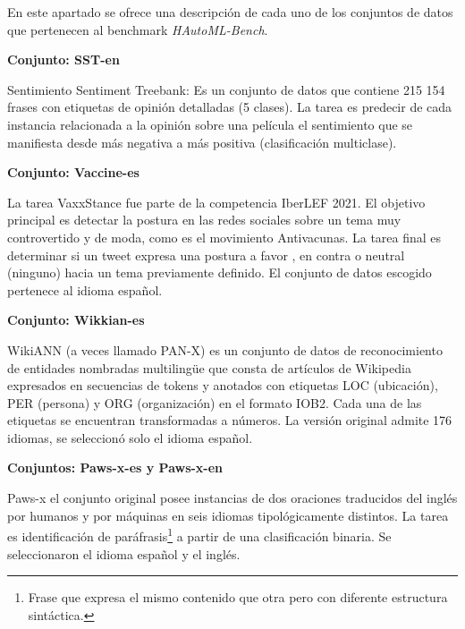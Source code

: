 \begin{annexes}
   
En este apartado se ofrece una descripción de cada uno de los conjuntos de datos que pertenecen al benchmark \textit{HAutoML-Bench}.


\begin{flushleft} 
    { \textbf{Conjunto: SST-en}}\label{description:sst-en}
\end{flushleft}

Sentimiento Sentiment Treebank: Es un conjunto de datos que contiene 215 154 frases con etiquetas de opinión detalladas (5 clases). 
La tarea es predecir de cada instancia relacionada a la opinión sobre una película el sentimiento que se manifiesta desde más negativa a más positiva 
(clasificación multiclase).


\begin{flushleft} 
    { \textbf{Conjunto: Vaccine-es}}\label{description:vaccine}
\end{flushleft}

La tarea VaxxStance fue parte de la competencia IberLEF 2021. El objetivo principal es detectar la postura en las redes sociales 
sobre un tema muy controvertido y de moda, como es el movimiento Antivacunas. La tarea final es determinar si un tweet expresa una postura a favor , 
en contra o neutral (ninguno) hacia un tema previamente definido. El conjunto de datos escogido pertenece al idioma español. 


\begin{flushleft} 
    { \textbf{Conjunto: Wikkian-es}}\label{description:wikkian}
\end{flushleft}

WikiANN (a veces llamado PAN-X) es un conjunto de datos de reconocimiento de entidades nombradas multilingüe que consta de artículos de Wikipedia expresados en secuencias de tokens y 
anotados con etiquetas LOC (ubicación), PER (persona) y ORG (organización) en el formato IOB2. Cada una de las etiquetas se encuentran transformadas a números. 
La versión original admite 176 idiomas, se seleccionó  solo el idioma español.  

\begin{flushleft} 
    { \textbf{Conjuntos: Paws-x-es y Paws-x-en}}\label{description:paws}
\end{flushleft}

Paws-x el conjunto original posee instancias de dos oraciones traducidos del inglés por humanos y por máquinas en seis idiomas tipológicamente distintos. La tarea es 
identificación de paráfrasis\footnote{Frase que expresa el mismo contenido que otra pero con diferente estructura sintáctica.} a partir de una clasificación binaria. 
Se seleccionaron el idioma español y el inglés. 


\end{annexes}
